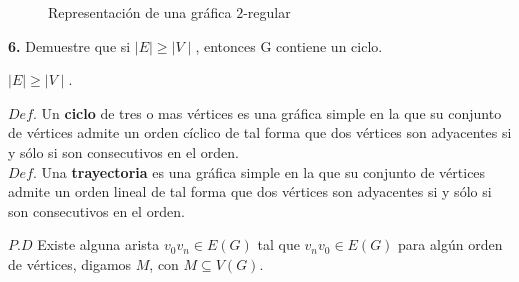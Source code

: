 \documentclass[12pt]{article}
\begin{document}
\begin{figure}[h!]
    \centering
    \begin{minipage}{0.6\textwidth}
        \centering
        \caption{Representación de una gráfica $2$-regular}
    \end{minipage}
\end{figure}

%
%
\textbf{6.} Demuestre que si $\mid E \mid \geq\mid V \mid$, entonces G contiene un ciclo.

\begin{tcolorbox}[title=\textbf{Hipotesis}, colback=red!15!white, colframe=black!, breakable]
    $\mid E \mid \geq \mid V \mid$.
\end{tcolorbox}

\begin{tcolorbox}[title=\textbf{Definiciones}, colback=blue!15!white, colframe=black!]
    $Def$. Un \textbf{ciclo} de tres o mas vértices es una gráfica simple en la que su conjunto de
    vértices admite un orden cíclico de tal forma que dos vértices son adyacentes si y sólo si son consecutivos en el orden.\\

    $Def$. Una \textbf{trayectoria} es una gráfica simple en la que su conjunto de vértices admite un orden lineal de tal forma 
    que dos vértices son adyacentes si y sólo si son consecutivos en el orden.
\end{tcolorbox}

$P.D$ Existe alguna arista $v_0 v_n \in E(G)$ tal que $v_n v_0 \in E(G)$ para algún orden de vértices, digamos $M$, con $M \subseteq V(G)$.\\
\end{document}
